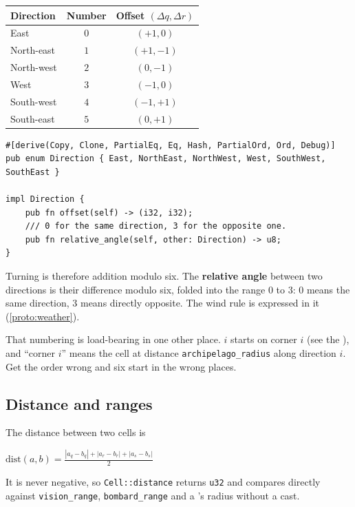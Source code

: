 \documentclass{article}
\begin{document}
\begin{center}
\begin{tabular}{|l|c|c|}
 \hline
 {\bf Direction} & {\bf Number} & {\bf Offset $(\Delta q, \Delta r)$} \\
 \hline\hline
 East & $0$ & $(+1, 0)$ \\
 \hline
 North-east & $1$ & $(+1, -1)$ \\
 \hline
 North-west & $2$ & $(0, -1)$ \\
 \hline
 West & $3$ & $(-1, 0)$ \\
 \hline
 South-west & $4$ & $(-1, +1)$ \\
 \hline
 South-east & $5$ & $(0, +1)$ \\
 \hline
\end{tabular}
\end{center}

\begin{lstlisting}
#[derive(Copy, Clone, PartialEq, Eq, Hash, PartialOrd, Ord, Debug)]
pub enum Direction { East, NorthEast, NorthWest, West, SouthWest, SouthEast }

impl Direction {
    pub fn offset(self) -> (i32, i32);
    /// 0 for the same direction, 3 for the opposite one.
    pub fn relative_angle(self, other: Direction) -> u8;
}
\end{lstlisting}

Turning is therefore addition modulo six. The \textbf{relative angle} between two directions is
their difference modulo six, folded into the range $0$ to $3$: $0$ means the same direction, $3$
means directly opposite. The wind rule is expressed in it (\cref{proto:weather}).

That numbering is load-bearing in one other place. \ship{} $i$ starts on corner $i$ (see the
\MD), and ``corner $i$'' means the cell at distance \texttt{archipelago\_radius} along direction
$i$. Get the order wrong and six \ships{} start in the wrong places.

\subsection{Distance and ranges}

The distance between two cells is

\begin{center}
$\mathrm{dist}(a,b) = \frac{|a_q - b_q| + |a_r - b_r| + |a_s - b_s|}{2}$
\end{center}

It is never negative, so \texttt{Cell::distance} returns \texttt{u32} and compares directly
against \texttt{vision\_range}, \texttt{bombard\_range} and a \clue's radius without a cast.
\end{document}
